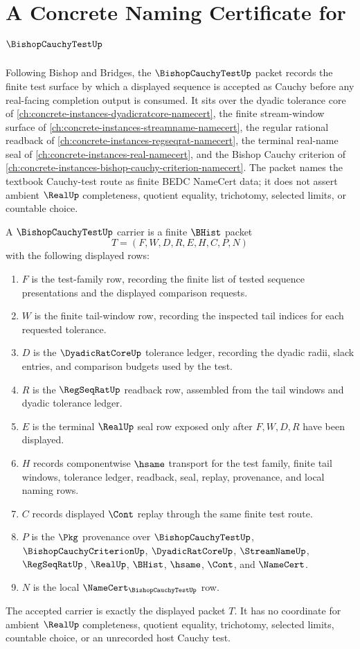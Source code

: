 \chapter{A Concrete Naming Certificate for $\BishopCauchyTestUp$}
\label{ch:concrete-instances-bishop-cauchy-test-namecert}

Following Bishop and Bridges, the $\BishopCauchyTestUp$ packet records the finite test surface by which a displayed sequence is accepted as Cauchy before any real-facing completion output is consumed. It sits over the dyadic tolerance core of \autoref{ch:concrete-instances-dyadicratcore-namecert}, the finite stream-window surface of \autoref{ch:concrete-instances-streamname-namecert}, the regular rational readback of \autoref{ch:concrete-instances-regseqrat-namecert}, the terminal real-name seal of \autoref{ch:concrete-instances-real-namecert}, and the Bishop Cauchy criterion of \autoref{ch:concrete-instances-bishop-cauchy-criterion-namecert}. The packet names the textbook Cauchy-test route as finite BEDC NameCert data; it does not assert ambient $\RealUp$ completeness, quotient equality, trichotomy, selected limits, or countable choice.

\begin{definition}
\label{def:bishop-cauchy-test-carrier}
A $\BishopCauchyTestUp$ carrier is a finite $\BHist$ packet
$$
T=(F,W,D,R,E,H,C,P,N)
$$
with the following displayed rows:
\begin{enumerate}
\item $F$ is the test-family row, recording the finite list of tested sequence presentations and the displayed comparison requests.
\item $W$ is the finite tail-window row, recording the inspected tail indices for each requested tolerance.
\item $D$ is the $\DyadicRatCoreUp$ tolerance ledger, recording the dyadic radii, slack entries, and comparison budgets used by the test.
\item $R$ is the $\RegSeqRatUp$ readback row, assembled from the tail windows and dyadic tolerance ledger.
\item $E$ is the terminal $\RealUp$ seal row exposed only after $F,W,D,R$ have been displayed.
\item $H$ records componentwise $\hsame$ transport for the test family, finite tail windows, tolerance ledger, readback, seal, replay, provenance, and local naming rows.
\item $C$ records displayed $\Cont$ replay through the same finite test route.
\item $P$ is the $\Pkg$ provenance over $\BishopCauchyTestUp$, $\BishopCauchyCriterionUp$, $\DyadicRatCoreUp$, $\StreamNameUp$, $\RegSeqRatUp$, $\RealUp$, $\BHist$, $\hsame$, $\Cont$, and $\NameCert$.
\item $N$ is the local $\NameCert_{\BishopCauchyTestUp}$ row.
\end{enumerate}
The accepted carrier is exactly the displayed packet $T$. It has no coordinate for ambient $\RealUp$ completeness, quotient equality, trichotomy, selected limits, countable choice, or an unrecorded host Cauchy test.
\end{definition}

